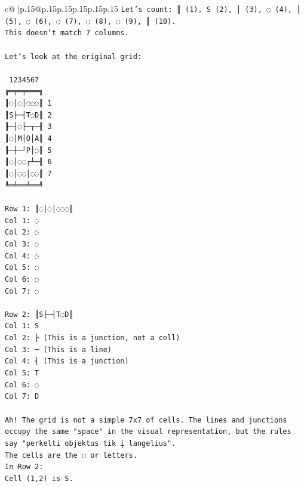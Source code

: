 \documentclass{article}
\begin{document}
{\begin{supertabular}{c@{$\;$}|p{.15\linewidth}@{}p{.15\linewidth}p{.15\linewidth}p{.15\linewidth}p{.15\linewidth}p{.15\linewidth}}
{{{\texttt{Let's count: ║ (1), S (2), │ (3), ◌ (4), │ (5), ◌ (6), ◌ (7), ◌ (8), ◌ (9), ║ (10).} \\
\texttt{This doesn't match 7 columns.} \\
\\ 
\texttt{Let's look at the original grid:} \\
\\ 
\texttt{ 1234567} \\
\texttt{╔═╤═╤═══╗} \\
\texttt{║◌│◌│◌◌◌║ 1} \\
\texttt{║S├─┤T◌D║ 2} \\
\texttt{╟─┤◌├─┬─╢ 3} \\
\texttt{║◌│M│O│A║ 4} \\
\texttt{╟─┼─┘P│◌║ 5} \\
\texttt{║◌│◌◌┌┴─╢ 6} \\
\texttt{║◌│◌◌│◌◌║ 7} \\
\texttt{╚═╧══╧══╝} \\
\\ 
\texttt{Row 1: ║◌│◌│◌◌◌║} \\
\texttt{Col 1: ◌} \\
\texttt{Col 2: ◌} \\
\texttt{Col 3: ◌} \\
\texttt{Col 4: ◌} \\
\texttt{Col 5: ◌} \\
\texttt{Col 6: ◌} \\
\texttt{Col 7: ◌} \\
\\ 
\texttt{Row 2: ║S├─┤T◌D║} \\
\texttt{Col 1: S} \\
\texttt{Col 2: ├ (This is a junction, not a cell)} \\
\texttt{Col 3: ─ (This is a line)} \\
\texttt{Col 4: ┤ (This is a junction)} \\
\texttt{Col 5: T} \\
\texttt{Col 6: ◌} \\
\texttt{Col 7: D} \\
\\ 
\texttt{Ah! The grid is not a simple 7x7 of cells. The lines and junctions occupy the same "space" in the visual representation, but the rules say "perkelti objektus tik į langelius".} \\
\texttt{The cells are the ◌ or letters.} \\
\texttt{In Row 2:} \\
\texttt{Cell (1,2) is S.} \\
}}}
\end{supertabular}}
\end{document}
